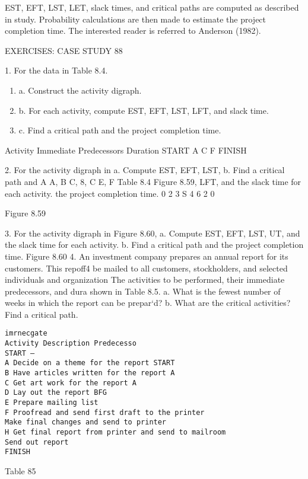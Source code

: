 \documentclass{article}
\begin{document}


EST, EFT, LST, LET, slack times, and critical paths are computed as described in study. 
Probability calculations are then made to estimate the project completion time. 
The interested reader is referred to Anderson (1982). 

EXERCISES: CASE STUDY 88 

1. For the data in Table 8.4. 

\begin{enumerate}
\item a. Construct the activity digraph. 
\item b. For each activity, compute EST, EFT, LST, LFT, and slack time. 
\item c. Find a critical path and the project completion time. 
\end{enumerate}


Activity Immediate Predecessors Duration START A C F FINISH 

2. For the activity digraph in a. Compute EST, EFT, LST, b. Find a critical path and 
A A, B C, 8, C E, F 
Table 8.4 
Figure 8.59, LFT, and the slack time for each activity. the project completion time. 
0 2 3 S 4 6 2 0 

Figure 8.59 



3. For the activity digraph in Figure 8.60, 
a. Compute EST, EFT, LST, UT, and the slack time for each activity. 
b. Find a critical path and the project completion time. 
Figure 8.60 
4. An investment company prepares an annual report for its customers. This repoff4 
be mailed to all customers, stockholders, and selected individuals and organization 
The activities to be performed, their immediate predecessors, and dura 
shown in Table 8.5. 
a. What is the fewest number of weeks in which the report can be prepar‘d? 
b. What are the critical activities? Find a critical path. 

\begin{verbatim}
imrnecgate 
Activity Description Predecesso 
START — 
A Decide on a theme for the report START 
B Have articles written for the report A 
C Get art work for the report A 
D Lay out the report BFG 
E Prepare mailing list 
F Proofread and send first draft to the printer 
Make final changes and send to printer 
H Get final report from printer and send to mailroom 
Send out report 
FINISH 
\end{verbatim}
Table 85 
\end{document}

